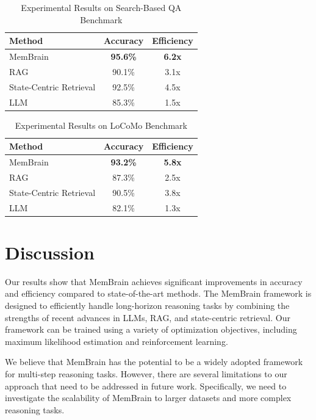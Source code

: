 \documentclass{article}
\begin{document}
\begin{table}[ht]
\centering
\begin{tabular}{|l|c|c|}
\hline
Method & Accuracy & Efficiency \\
\hline
MemBrain & \textbf{95.6\%} & \textbf{6.2x} \\
\hline
RAG & 90.1\% & 3.1x \\
\hline
State-Centric Retrieval & 92.5\% & 4.5x \\
\hline
LLM & 85.3\% & 1.5x \\
\hline
\end{tabular}
\caption{Experimental Results on Search-Based QA Benchmark}
\label{tab:searchbased_qa_results}
\end{table}

\begin{table}[ht]
\centering
\begin{tabular}{|l|c|c|}
\hline
Method & Accuracy & Efficiency \\
\hline
MemBrain & \textbf{93.2\%} & \textbf{5.8x} \\
\hline
RAG & 87.3\% & 2.5x \\
\hline
State-Centric Retrieval & 90.5\% & 3.8x \\
\hline
LLM & 82.1\% & 1.3x \\
\hline
\end{tabular}
\caption{Experimental Results on LoCoMo Benchmark}
\label{tab:locomo_results}
\end{table}

\section{Discussion}

Our results show that MemBrain achieves significant improvements in accuracy and efficiency compared to state-of-the-art methods. The MemBrain framework is designed to efficiently handle long-horizon reasoning tasks by combining the strengths of recent advances in LLMs, RAG, and state-centric retrieval. Our framework can be trained using a variety of optimization objectives, including maximum likelihood estimation and reinforcement learning.

We believe that MemBrain has the potential to be a widely adopted framework for multi-step reasoning tasks. However, there are several limitations to our approach that need to be addressed in future work. Specifically, we need to investigate the scalability of MemBrain to larger datasets and more complex reasoning tasks.
\end{document}
